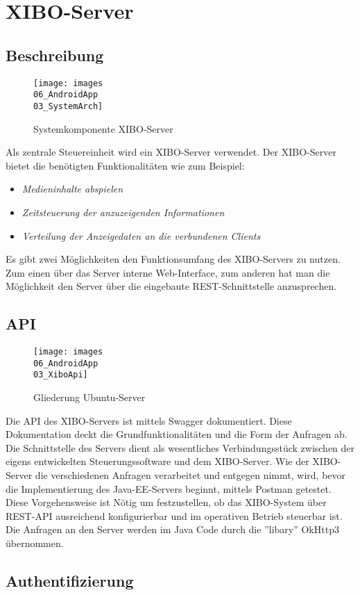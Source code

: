\chapter{XIBO-Server}
\section{Beschreibung}
\begin{figure}[H]
\centering
\texttt{[image: images\\06\_AndroidApp\\03\_SystemArch]}
\caption{Systemkomponente XIBO-Server}
\label{fig:mediaNav}
\end{figure}
Als zentrale Steuereinheit wird ein XIBO-Server verwendet. Der XIBO-Server bietet die benötigten Funktionalitäten wie zum Beispiel:
\begin{itemize}
	\item {\em Medieninhalte abspielen} 
	\item {\em Zeitsteuerung der anzuzeigenden Informationen}  
	\item {\em Verteilung der Anzeigedaten an die verbundenen Clients} 
\end{itemize}
Es gibt zwei Möglichkeiten den Funktionsumfang des XIBO-Servers zu nutzen. Zum einen über das Server interne Web-Interface, zum anderen hat man die  Möglichkeit den Server über die eingebaute REST-Schnittstelle anzusprechen.
\cite{xibo-server}
\section{API}
\begin{figure}[H]
\centering
\texttt{[image: images\\06\_AndroidApp\\03\_XiboApi]}
\caption{Gliederung Ubuntu-Server}
\label{fig:mediaNav}
\end{figure}
Die API des XIBO-Servers ist mittels Swagger dokumentiert. Diese Dokumentation deckt die Grundfunktionalitäten und die Form der Anfragen ab. Die Schnittstelle des Servers dient als wesentliches Verbindungsstück zwischen der eigens entwickelten Steuerungssoftware und dem XIBO-Server. Wie der XIBO-Server die verschiedenen Anfragen verarbeitet und entgegen nimmt, wird, bevor die Implementierung des Java-EE-Servers beginnt, mittels Postman getestet. Diese Vorgehensweise ist Nötig um festzustellen, ob das XIBO-System über REST-API ausreichend konfigurierbar und im operativen Betrieb steuerbar ist. Die Anfragen an den Server werden im Java Code durch die ''libary'' OkHttp3 übernommen.

\cite{swagger}
\cite{postman}
\cite{Okhttp3}
\section{Authentifizierung}


